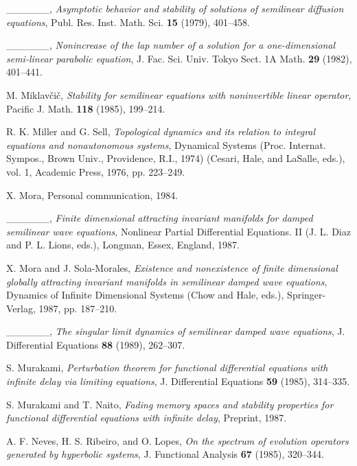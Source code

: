 \documentclass{surv-l}
\theoremstyle{plain}
\theoremstyle{definition}
\numberwithin{equation}{section}
\numberwithin{figure}{chapter}
\begin{document}
\begin{thebibliography}{}
 \_\_\_\_\_\_, \emph{Asymptotic behavior and stability of solutions of semilinear diffusion equations}, Publ. Res. Inst. Math. Sci. \textbf{15} (1979), 401--458.

 \_\_\_\_\_\_, \emph{Nonincrease of the lap number of a solution for a one-dimensional semi-linear parabolic equation}, J. Fac. Sci. Univ. Tokyo Sect. 1A Math. \textbf{29} (1982), 401--441.

M. Miklav\v{c}i\v{c}, \emph{Stability for semilinear equations with noninvertible linear operator}, Pacific J. Math. \textbf{118} (1985), 199--214.

R. K. Miller and G. Sell, \emph{Topological dynamics and its relation to integral equations and nonautonomous systems}, Dynamical Systems (Proc. Internat. Sympos., Brown
Univ., Providence, R.I., 1974) (Cesari, Hale, and LaSalle, eds.), vol. 1,
Academic Press, 1976, pp. 223--249.

X. Mora, Personal communication, 1984.

 \_\_\_\_\_\_, \emph{Finite dimensional attracting invariant manifolds for damped semilinear wave equations}, Nonlinear Partial Differential Equations. II (J. L. Diaz and P. L. Lions, eds.), Longman, Essex, England, 1987.

X. Mora and J. Sola-Morales, \emph{Existence and nonexistence of finite dimensional globally attracting invariant manifolds in semilinear damped wave equations}, Dynamics of Infinite Dimensional Systems
(Chow and Hale, eds.), Springer-Verlag, 1987, pp. 187--210.

 \_\_\_\_\_\_, \emph{The singular limit dynamics of semilinear damped wave equations}, J. Differential Equations \textbf{88} (1989), 262--307.

S. Murakami, \emph{Perturbation theorem for functional differential equations with infinite delay via limiting equations}, J. Differential Equations \textbf{59} (1985), 314--335.

S. Murakami and T. Naito, \emph{Fading memory spaces and stability properties for functional differential equations with infinite delay}, Preprint, 1987.

A. F. Neves, H. S. Ribeiro, and O. Lopes, \emph{On the spectrum of evolution operators generated by hyperbolic systems}, J. Functional Analysis \textbf{67} (1985), 320--344.


\end{thebibliography}
\end{document}
